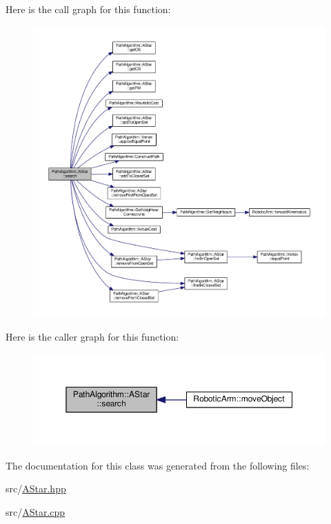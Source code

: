 Here is the call graph for this function\+:\nopagebreak
\begin{figure}[H]
\begin{center}
\leavevmode
\includegraphics[width=350pt]{class_path_algorithm_1_1_a_star_aee41b31ec44b02f6dc94889d228a3582_cgraph}
\end{center}
\end{figure}




Here is the caller graph for this function\+:\nopagebreak
\begin{figure}[H]
\begin{center}
\leavevmode
\includegraphics[width=350pt]{class_path_algorithm_1_1_a_star_aee41b31ec44b02f6dc94889d228a3582_icgraph}
\end{center}
\end{figure}




The documentation for this class was generated from the following files\+:\begin{DoxyCompactItemize}
\item 
src/\hyperlink{_a_star_8hpp}{A\+Star.\+hpp}\item 
src/\hyperlink{_a_star_8cpp}{A\+Star.\+cpp}\end{DoxyCompactItemize}
